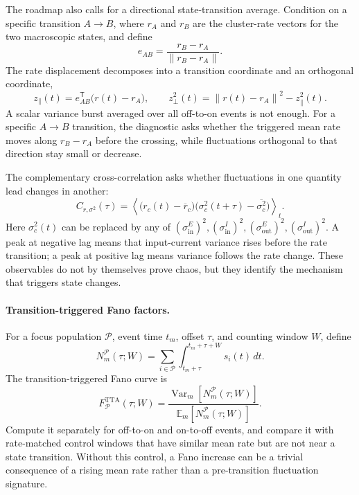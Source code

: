 The roadmap also calls for a directional state-transition average. Condition on
a specific transition \(A\to B\), where \(r_A\) and \(r_B\) are the cluster-rate
vectors for the two macroscopic states, and define
\begin{equation}
    e_{AB}
    =
    \frac{r_B-r_A}{\|r_B-r_A\|}.
    \label{eq:ch09-transition-direction}
\end{equation}
The rate displacement decomposes into a transition coordinate and an orthogonal
coordinate,
\begin{equation}
    z_{\parallel}(t)
    =
    e_{AB}^{\mathsf T}\bigl(r(t)-r_A\bigr),
    \qquad
    z_{\perp}^2(t)
    =
    \left\|r(t)-r_A\right\|^2-z_{\parallel}^2(t).
    \label{eq:ch09-transition-projections}
\end{equation}
A scalar variance burst averaged over all off-to-on events is not enough. For a
specific \(A\to B\) transition, the diagnostic asks whether the triggered mean
rate moves along \(r_B-r_A\) before the crossing, while fluctuations orthogonal
to that direction stay small or decrease.

The complementary cross-correlation asks whether fluctuations in one quantity
lead changes in another:
\begin{equation}
    C_{r,\sigma^2}(\tau)
    =
    \left\langle
    \bigl(r_c(t)-\overline r_c\bigr)
    \bigl(\sigma_c^2(t+\tau)-\overline{\sigma_c^2}\bigr)
    \right\rangle_t .
    \label{eq:ch09-cross-correlation}
\end{equation}
Here \(\sigma_c^2(t)\) can be replaced by any of
\((\sigma_{\mathrm{in}}^E)^2,(\sigma_{\mathrm{in}}^I)^2,
(\sigma_{\mathrm{out}}^E)^2,(\sigma_{\mathrm{out}}^I)^2\). A peak at negative
lag means that input-current variance rises before the rate transition; a peak
at positive lag means variance follows the rate change. These observables do
not by themselves prove chaos, but they identify the mechanism that triggers
state changes.

\paragraph{Transition-triggered Fano factors.}
For a focus population \(\mathcal P\), event time \(t_m\), offset \(\tau\), and
counting window \(W\), define
\begin{equation}
    N_m^{\mathcal P}(\tau;W)
    =
    \sum_{i\in\mathcal P}
    \int_{t_m+\tau}^{t_m+\tau+W}s_i(t)\,dt .
    \label{eq:ch09-transition-counts}
\end{equation}
The transition-triggered Fano curve is
\begin{equation}
    F_{\mathcal P}^{\mathrm{TTA}}(\tau;W)
    =
    \frac{\operatorname{Var}_m[N_m^{\mathcal P}(\tau;W)]}
    {\mathbb E_m[N_m^{\mathcal P}(\tau;W)]}.
    \label{eq:ch09-transition-fano}
\end{equation}
Compute it separately for off-to-on and on-to-off events, and compare it with
rate-matched control windows that have similar mean rate but are not near a
state transition. Without this control, a Fano increase can be a trivial
consequence of a rising mean rate rather than a pre-transition fluctuation
signature.

